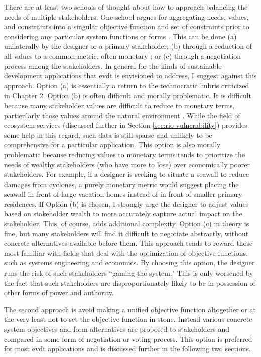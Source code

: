 There are at least two schools of thought about how to approach balancing the needs of multiple stakeholders. One school argues for aggregating needs, values, and constraints into a singular objective function and set of constraints prior to considering any particular system functions or forms \cite{hazelriggFundamentalsDecisionMaking2012}. This can be done (a) unilaterally by the designer or a primary stakeholder; (b) through a reduction of all values to a common metric, often monetary \cite{viscusiEconomicsRegulationAntitrust2018}; or (c) through a negotiation process among the stakeholders. In general for the kinds of sustainable development applications that \ac{evdt} is envisioned to address, I suggest against this approach. Option (a) is essentially a return to the technocratic hubris criticized in Chapter 2. Option (b) is often difficult and morally problematic. It is difficult because many stakeholder values are difficult to reduce to monetary terms, particularly those values around the natural environment \cite{ackermanPricingPricelessCostBenefit2001}. While the field of ecosystem services (discussed further in Section \ref{sec:rio-vulnerability}) provides some help in this regard, such data is still sparse and unlikely to be comprehensive for a particular application. This option is also morally problematic because reducing values to monetary terms tends to prioritize the needs of wealthy stakeholders (who have more to lose) over economically poorer stakeholders. For example, if a designer is seeking to situate a seawall to reduce damages from cyclones, a purely monetary metric would suggest placing the seawall in front of large vacation homes instead of in front of smaller primary residences. If Option (b) is chosen, I strongly urge the designer to adjust values based on stakeholder wealth to more accurately capture actual impact on the stakeholder. This, of course, adds additional complexity. Option (c) in theory is fine, but many stakeholders will find it difficult to negotiate abstractly, without concrete alternatives available before them. This approach tends to reward those most familiar with fields that deal with the optimization of objective functions, such as systems engineering and economics. By choosing this option, the designer runs the risk of such stakeholders ``gaming the system." This is only worsened by the fact that such stakeholders are disproportionately likely to be in possession of other forms of power and authority.

The second approach is avoid making a unified objective function altogether or at the very least not to set the objective function in stone. Instead various concrete system objectives and form alternatives are proposed to stakeholders and compared in some form of negotiation or voting process. This option is preferred for most \ac{evdt} applications and is discussed further in the following two sections.  


